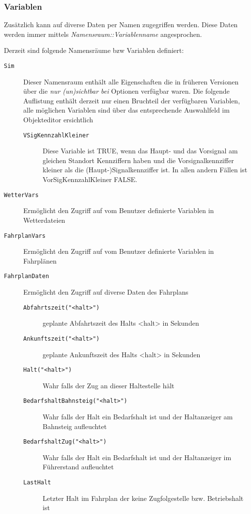 \subsubsection{Variablen}
\label{sec:editor-obj-logischeausdruecke-vars}

Zusätzlich kann auf diverse Daten per Namen zugegriffen werden. Diese
Daten werden immer mittels \emph{Namensraum::Variablenname}
angesprochen.

Derzeit sind folgende Namensräume bzw Variablen definiert:

\begin{description}
\item[\texttt{Sim}]
Dieser Namensraum enthält alle Eigenschaften die in früheren Versionen über die \emph{nur (un)sichtbar bei} Optionen verfügbar waren.
Die folgende Auflistung enthält derzeit nur einen Bruchteil der verfügbaren Variablen, alle möglichen Variablen sind über das entsprechende Auswahlfeld im Objekteditor ersichtlich
\begin{description}
\item[\texttt{VSigKennzahlKleiner}]
Diese Variable ist TRUE, wenn das Haupt- und das Vorsignal am gleichen Standort Kennziffern haben und die Vorsignalkennziffer kleiner als die (Haupt-)Signalkennziffer ist. In allen andern Fällen ist VorSigKennzahlKleiner FALSE.
\end{description}


\item[\texttt{WetterVars}]
Ermöglicht den Zugriff auf vom Benutzer definierte Variablen in
Wetterdateien
\item[\texttt{FahrplanVars}]
Ermöglicht den Zugriff auf vom Benutzer definierte Variablen in
Fahrplänen
\item[\texttt{FahrplanDaten}]
Ermöglicht den Zugriff auf diverse Daten des Fahrplans

\begin{description}
\item[\texttt{Abfahrtszeit("\textless{}halt\textgreater{}")}]
geplante Abfahrtszeit des Halts \textless{}halt\textgreater{} in
Sekunden
\item[\texttt{Ankunftszeit("\textless{}halt\textgreater{}")}]
geplante Ankunftszeit des Halts \textless{}halt\textgreater{} in
Sekunden
\item[\texttt{Halt("\textless{}halt\textgreater{}")}]
Wahr falls der Zug an dieser Haltestelle hält
\item[\texttt{BedarfshaltBahnsteig("\textless{}halt\textgreater{}")}]
Wahr falls der Halt ein Bedarfshalt ist und der Haltanzeiger am Bahnsteig aufleuchtet
\item[\texttt{BedarfshaltZug("\textless{}halt\textgreater{}")}]
Wahr falls der Halt ein Bedarfshalt ist und der Haltanzeiger im Führerstand aufleuchtet
\item[\texttt{LastHalt}]
Letzter Halt im Fahrplan der keine Zugfolgestelle bzw. Betriebshalt ist
\end{description}


\end{description}
